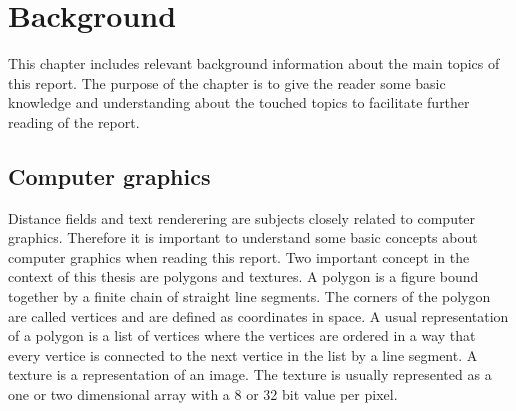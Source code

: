 \chapter{Background}\label{cha:theory}
This chapter includes relevant background information about the main topics of this report. The purpose of the chapter is to give the reader some basic knowledge and understanding about the touched topics to facilitate further reading of the report.
\section{Computer graphics}\label{computergraphics}
Distance fields and text renderering are subjects closely related to computer graphics. Therefore it is important to understand some basic concepts about computer graphics when reading this report. Two important concept in the context of this thesis are polygons and textures. A polygon is a figure bound together by a finite chain of straight line segments. The corners of the polygon are called vertices and are defined as coordinates in space. A usual representation of a polygon is a list of vertices where the vertices are ordered in a way that every vertice is connected to the next vertice in the list by a line segment. A texture is a representation of an image. The texture is usually represented as a one or two dimensional array with a 8 or 32 bit value per pixel. 

